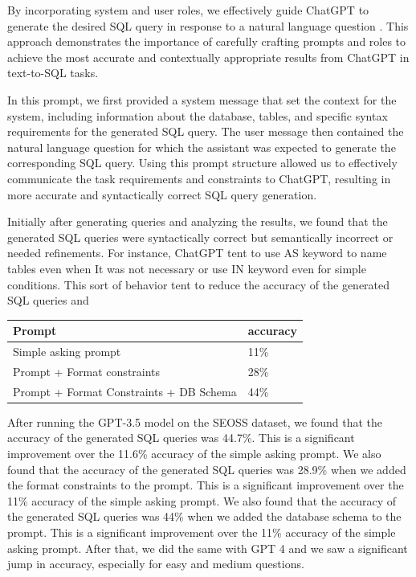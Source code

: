 By incorporating system and user roles, we effectively guide ChatGPT to generate the desired SQL query in response to a natural language question \cite{white2023prompt}. This approach demonstrates the importance of carefully crafting prompts and roles to achieve the most accurate and contextually appropriate results from ChatGPT in text-to-SQL tasks.

In this prompt, we first provided a system message that set the context for the system, including information about the database, tables, and specific syntax requirements for the generated SQL query. The user message then contained the natural language question for which the assistant was expected to generate the corresponding SQL query.
Using this prompt structure allowed us to effectively communicate the task requirements and constraints to ChatGPT, resulting in more accurate and syntactically correct SQL query generation.

Initially after generating queries and analyzing the results, we found that the generated SQL queries were syntactically correct but semantically incorrect or needed refinements. For instance, ChatGPT tent to use AS keyword to name tables even when It was not necessary or use IN keyword even for simple conditions. This sort of behavior tent to reduce the accuracy of the generated SQL queries and

\begin{table}[H]
    \centering
    \begin{tabular}{|l|l|}
        \hline
        \textbf{Prompt}         & \textbf{accuracy} \\ \hline
        Simple asking prompt    & 11\%              \\ \hline
        Prompt + Format constraints & 28\%              \\ \hline
        Prompt + Format Constraints + DB Schema         & 44\%              \\ \hline
    \end{tabular}
\end{table}

After running the GPT-3.5 model on the SEOSS dataset, we found that the accuracy of the generated SQL queries was 44.7\%. This is a significant improvement over the 11.6\% accuracy of the simple asking prompt. We also found that the accuracy of the generated SQL queries was 28.9\% when we added the format constraints to the prompt. This is a significant improvement over the 11\% accuracy of the simple asking prompt. We also found that the accuracy of the generated SQL queries was 44\% when we added the database schema to the prompt. This is a significant improvement over the 11\% accuracy of the simple asking prompt. After that, we did the same with GPT 4 and we saw a significant jump in accuracy, especially for easy and medium questions.

